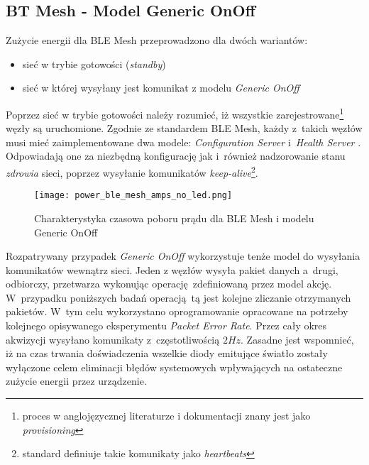 \subsection{BT Mesh - Model Generic OnOff}

Zużycie energii dla \gls{BLE} Mesh przeprowadzono dla dwóch wariantów:
\begin{itemize}
\item sieć w trybie gotowości (\textit{standby})
\item sieć w której wysyłany jest komunikat z modelu \textit{Generic OnOff}
\end{itemize}

Poprzez sieć w trybie gotowości należy rozumieć, iż wszystkie zarejestrowane\footnote{proces w anglojęzycznej literaturze i dokumentacji znany jest jako \textit{provisioning}}
węzły są uruchomione. Zgodnie ze standardem BLE Mesh, każdy z~takich węzłów musi mieć zaimplementowane dwa modele:
\textit{Configuration Server} i~\textit{Health Server} \cite{wooley_martin_bluetooth_2019}. 
Odpowiadają one za niezbędną konfigurację jak i~również nadzorowanie stanu \textit{zdrowia} sieci, poprzez wysyłanie 
komunikatów \textit{keep-alive}\footnote{standard definiuje takie komunikaty jako \textit{heartbeats}\cite{wooley_martin_bluetooth_2019}\cite{mesh_working_group_mesh_2019}}.

\begin{figure}[!ht]
	\centering \texttt{[image: power\_ble\_mesh\_amps\_no\_led.png]} 
	\caption{Charakterystyka czasowa poboru prądu dla BLE Mesh i modelu Generic OnOff}
	\label{rys:power_ble_mesh_amps}
\end{figure}

Rozpatrywany przypadek \textit{Generic OnOff} wykorzystuje tenże model do wysyłania komunikatów wewnątrz sieci.
Jeden z węzłów wysyła pakiet danych a~drugi, odbiorczy, przetwarza wykonując operację zdefiniowaną przez model akcję.
W~przypadku poniższych badań operacją tą jest kolejne zliczanie otrzymanych pakietów.
W~tym celu wykorzystano oprogramowanie opracowane na potrzeby kolejnego opisywanego eksperymentu \textit{Packet Error Rate}.
Przez cały okres akwizycji wysyłano komunikaty z~częstotliwością $2Hz$. Zasadne jest wspomnieć, iż na czas trwania doświadczenia wszelkie 
diody emitujące światło zostały wyłączone celem eliminacji błędów systemowych wpływających na ostateczne zużycie energii przez
urządzenie.


